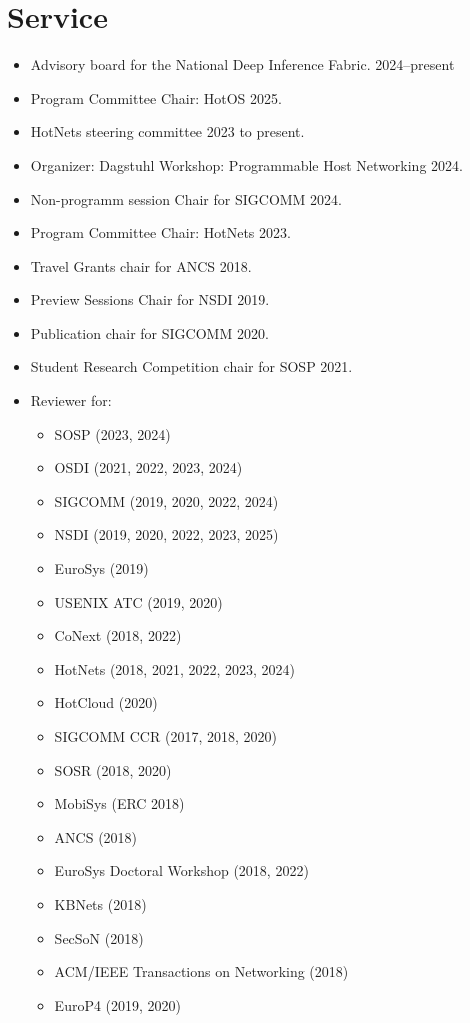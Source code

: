 \documentclass[11pt,letterpaper,sans]{moderncv}        %
\begin{document}
\section{Service}
\begin{itemize}
    \item Advisory board for the National Deep Inference Fabric. 2024--present
    \item Program Committee Chair: HotOS 2025.
    \item HotNets steering committee 2023 to present.
    \item Organizer: Dagstuhl Workshop: Programmable Host Networking
        2024.
    \item Non-programm session Chair for SIGCOMM 2024.
    \item Program Committee Chair: HotNets 2023.
    \item Travel Grants chair for ANCS 2018.
    \item Preview Sessions Chair for NSDI 2019.
    \item Publication chair for SIGCOMM 2020. 
    \item Student Research Competition chair for SOSP 2021. 
    \item Reviewer for:
        \begin{itemize}
            \item SOSP (2023, 2024)
            \item OSDI (2021, 2022, 2023, 2024)
            \item SIGCOMM (2019, 2020, 2022, 2024)
            \item NSDI (2019, 2020, 2022, 2023, 2025)
            \item EuroSys (2019)
            \item USENIX ATC (2019, 2020)
            \item CoNext (2018, 2022)
            \item HotNets (2018, 2021, 2022, 2023, 2024)
            \item HotCloud (2020)
            \item SIGCOMM CCR (2017, 2018, 2020)
            \item SOSR (2018, 2020)
            \item MobiSys (ERC 2018)
            \item ANCS (2018)
            \item EuroSys Doctoral Workshop (2018, 2022)
            \item KBNets (2018)
            \item SecSoN (2018)
            \item ACM/IEEE Transactions on Networking (2018)
            \item EuroP4 (2019, 2020)
        \end{itemize}
\end{itemize}
\end{document}
